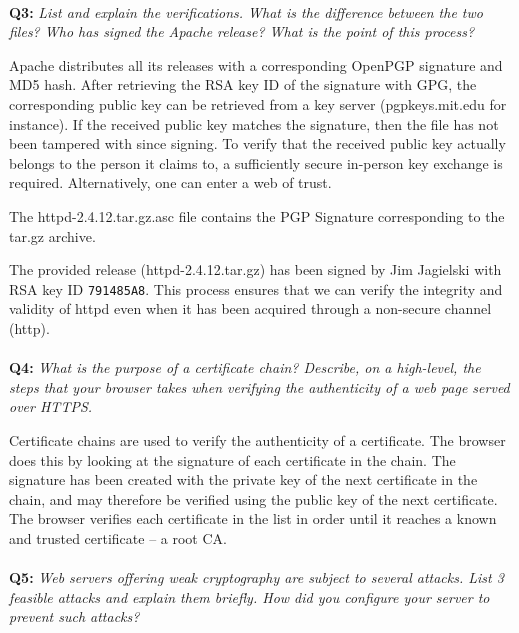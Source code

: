 \paragraph{}
\textbf{Q3:}
\textit{List and explain the verifications. What is the difference between the two files? Who has signed the Apache release? What is the point of this process?}

Apache distributes all its releases with a corresponding OpenPGP signature\cite{pgp} and MD5 hash.
After retrieving the RSA key ID of the signature with GPG\cite{gpg}, the corresponding public key can be retrieved from a key server (pgpkeys.mit.edu for instance).
If the received public key matches the signature, then the file has not been tampered with since signing.
To verify that the received public key actually belongs to the person it claims to, a sufficiently secure in-person key exchange is required.
Alternatively, one can enter a web of trust.

The httpd-2.4.12.tar.gz.asc file contains the PGP Signature corresponding to the tar.gz archive.

The provided release (httpd-2.4.12.tar.gz) has been signed by Jim Jagielski with RSA key ID \verb/791485A8/.
This process ensures that we can verify the integrity and validity of httpd even when it has been acquired through a non-secure channel (http).

\paragraph{}
\textbf{Q4:}
\textit{What is the purpose of a certificate chain? Describe, on a high-level, the steps that your browser takes when verifying the authenticity of a web page served over HTTPS.}

Certificate chains are used to verify the authenticity of a certificate.
The browser does this by looking at the signature of each certificate in the chain.
The signature has been created with the private key of the next certificate in the chain, and may therefore be verified using the public key of the next certificate.
The browser verifies each certificate in the list in order until it reaches a known and trusted certificate – a root CA.\cite{x509}

\paragraph{}
\textbf{Q5:}
\textit{Web servers offering weak cryptography are subject to several attacks. List 3 feasible attacks and explain them briefly. How did you configure your server to prevent such attacks?}

